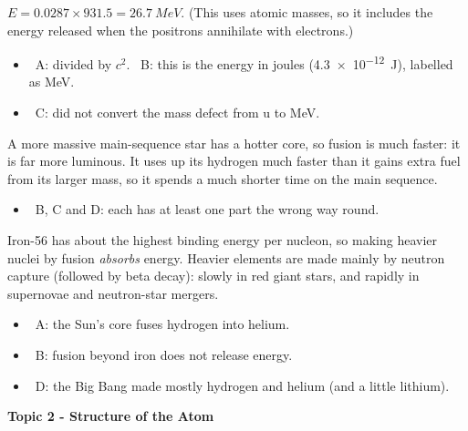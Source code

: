 \documentclass[12pt]{article}
\newcommand\anstopic[1]{\par\Needspace{8\baselineskip}\vspace{4mm}%
  \begin{center}{\headfont\bfseries\fontsize{14}{18}\selectfont #1\par}\end{center}\vspace{2pt}}
\begin{document}
\begin{practiceanswers}
\begin{practiceans}
  $E = 0.0287 \times 931.5 = \qty{26.7}{MeV}$. (This uses atomic masses, so it includes the energy
  released when the positrons annihilate with electrons.)
  \begin{itemize}
    \item \xmark\ A: divided by $c^2$. \quad \xmark\ B: this is the energy in joules
          (\qty{4.3e-12}{J}), labelled as MeV.
    \item \xmark\ C: did not convert the mass defect from u to MeV.
  \end{itemize}
\end{practiceans}

\begin{practiceans}
  A more massive main-sequence star has a hotter core, so fusion is much faster: it is far more
  luminous. It uses up its hydrogen much faster than it gains extra fuel from its larger mass, so it
  spends a much shorter time on the main sequence.
  \begin{itemize}
    \item \xmark\ B, C and D: each has at least one part the wrong way round.
  \end{itemize}
\end{practiceans}

\begin{practiceans}
  Iron-56 has about the highest binding energy per nucleon, so making heavier nuclei by fusion
  \emph{absorbs} energy. Heavier elements are made mainly by neutron capture (followed by beta decay):
  slowly in red giant stars, and rapidly in supernovae and neutron-star mergers.
  \begin{itemize}
    \item \xmark\ A: the Sun's core fuses hydrogen into helium.
    \item \xmark\ B: fusion beyond iron does not release energy.
    \item \xmark\ D: the Big Bang made mostly hydrogen and helium (and a little lithium).
  \end{itemize}
\end{practiceans}

\anstopic{Topic 2 - Structure of the Atom}


\end{practiceanswers}
\end{document}
